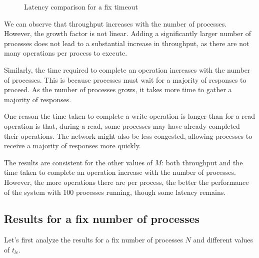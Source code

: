 \documentclass{article}
\begin{document}
\begin{figure}[ht!]
    \centering
    \caption{Latency comparison for a fix timeout}
\end{figure}


We can observe that throughput increases with the number of processes. However,
the growth factor is not linear. Adding a significantly larger number of processes
does not lead to a substantial increase in throughput, as there are not many
operations per process to execute.

Similarly, the time required to complete an operation increases with the number
of processes. This is because processes must wait for a majority of responses
to proceed. As the number of processes grows, it takes more time to gather a
majority of responses.

One reason the time taken to complete a write operation is longer than for a
read operation is that, during a read, some processes may have already completed
their operations. The network might also be less congested, allowing processes
to receive a majority of responses more quickly.

\vspace{10pt}
The results are consistent for the other values of
$M$: both throughput and the time taken to complete an operation
increase with the number of processes. However, the more operations
there are per process, the better the performance of the system with
 100 processes running, though some latency remains.

\newpage

\subsection{Results for a fix number of processes}
Let's first analyze the results for a fix number of processes $N$ and different values of $t_{le}$.
\end{document}
